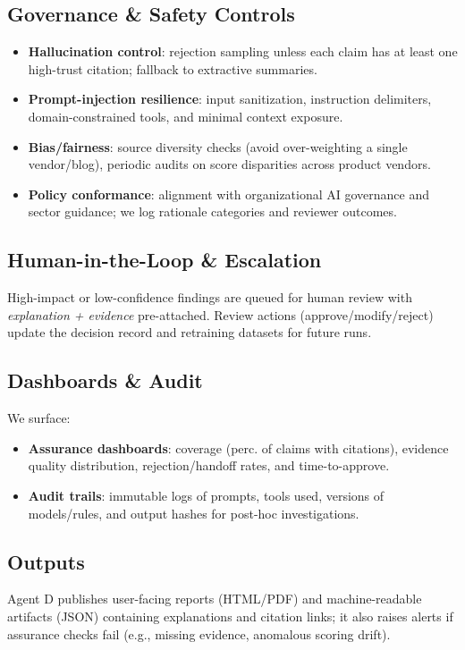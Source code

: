 \subsection{Governance \& Safety Controls}
\begin{itemize}
  \item \textbf{Hallucination control}: rejection sampling unless each claim has at least one high-trust citation; fallback to extractive summaries.
  \item \textbf{Prompt-injection resilience}: input sanitization, instruction delimiters, domain-constrained tools, and minimal context exposure.
  \item \textbf{Bias/fairness}: source diversity checks (avoid over-weighting a single vendor/blog), periodic audits on score disparities across product vendors.
  \item \textbf{Policy conformance}: alignment with organizational AI governance and sector guidance; we log rationale categories and reviewer outcomes.
\end{itemize}

\subsection{Human-in-the-Loop \& Escalation}
High-impact or low-confidence findings are queued for human review with \emph{explanation + evidence} pre-attached. Review actions (approve/modify/reject) update the decision record and retraining datasets for future runs.

\subsection{Dashboards \& Audit}
We surface:
\begin{itemize}
  \item \textbf{Assurance dashboards}: coverage (perc. of claims with citations), evidence quality distribution, rejection/handoff rates, and time-to-approve.
  \item \textbf{Audit trails}: immutable logs of prompts, tools used, versions of models/rules, and output hashes for post-hoc investigations.
\end{itemize}

\subsection{Outputs}
Agent D publishes user-facing reports (HTML/PDF) and machine-readable artifacts (JSON) containing explanations and citation links; it also raises alerts if assurance checks fail (e.g., missing evidence, anomalous scoring drift).
